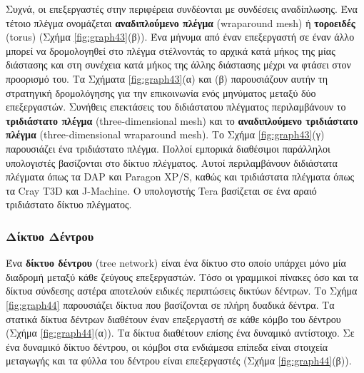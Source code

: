 \documentclass[12pt,a4paper]{article} %
\begin{document}
Συχνά, οι επεξεργαστές στην περιφέρεια συνδέονται με συνδέσεις αναδίπλωσης. 
Ένα τέτοιο πλέγμα ονομάζεται \textbf{αναδιπλούμενο πλέγμα} 
(wraparound mesh) ή \textbf{τοροειδές} (torus) 
{(}Σχήμα \ref{fig:graph43}(β){)}. Ένα μήνυμα από έναν επεξεργαστή σε έναν άλλο 
μπορεί να δρομολογηθεί στο πλέγμα στέλνοντάς το αρχικά κατά μήκος της μίας 
διάστασης και στη συνέχεια κατά μήκος της άλλης διάστασης μέχρι να φτάσει 
στον προορισμό του. Τα Σχήματα \ref{fig:graph43}(α) και (β) παρουσιάζουν 
αυτήν τη στρατηγική δρομολόγησης για την επικοινωνία ενός μηνύματος μεταξύ 
δύο επεξεργαστών. Συνήθεις επεκτάσεις του διδιάστατου πλέγματος 
περιλαμβάνουν το \textbf{τριδιάστατο πλέγμα} (three-dimensional mesh) 
και το \textbf{αναδιπλούμενο τριδιάστατο πλέγμα} (three-dimensional wraparound mesh). 
Το Σχήμα \ref{fig:graph43}(γ) παρουσιάζει ένα τριδιάστατο πλέγμα. Πολλοί εμπορικά διαθέσιμοι 
παράλληλοι υπολογιστές βασίζονται στο δίκτυο πλέγματος. Αυτοί περιλαμβάνουν 
διδιάστατα πλέγματα όπως τα DAP και 
Paragon XP/S, καθώς και τριδιάστατα πλέγματα όπως 
τα Cray T3D και J-Machine. 
Ο υπολογιστής Tera βασίζεται σε ένα αραιό τριδιάστατο 
δίκτυο πλέγματος.

\subsubsection*{Δίκτυο Δέντρου} 
Ένα \textbf{δίκτυο δέντρου} (tree network)  
είναι ένα δίκτυο στο οποίο υπάρχει μόνο μία διαδρομή μεταξύ κάθε ζεύγους 
επεξεργαστών. Τόσο οι γραμμικοί πίνακες όσο και τα δίκτυα σύνδεσης 
αστέρα αποτελούν ειδικές περιπτώσεις δικτύων δέντρων. Το Σχήμα \ref{fig:graph44} 
παρουσιάζει δίκτυα που βασίζονται σε πλήρη δυαδικά δέντρα. Τα στατικά 
δίκτυα δέντρων διαθέτουν έναν επεξεργαστή σε κάθε κόμβο του δέντρου {(}Σχήμα \ref{fig:graph44}(α){)}. 
Τα δίκτυα  διαθέτουν επίσης ένα δυναμικό αντίστοιχο. Σε ένα 
δυναμικό δίκτυο δέντρου, οι κόμβοι στα ενδιάμεσα επίπεδα είναι στοιχεία 
μεταγωγής και τα φύλλα του δέντρου είναι επεξεργαστές (Σχήμα \ref{fig:graph44}(β){)}.
\end{document}
